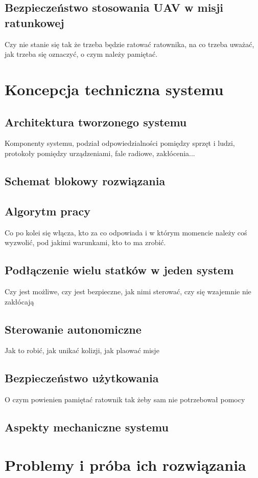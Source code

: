 \subsection{Bezpieczeństwo stosowania UAV w misji ratunkowej}
Czy nie stanie się tak że trzeba będzie ratować ratownika, na co trzeba uważać, jak trzeba się oznaczyć, o czym należy pamiętać.

\section{Koncepcja techniczna systemu}
\subsection{Architektura tworzonego systemu}
Komponenty systemu, podział odpowiedzialności pomiędzy sprzęt i ludzi, protokoły pomiędzy urządzeniami, fale radiowe, zakłócenia...
\subsection{Schemat blokowy rozwiązania}
\subsection{Algorytm pracy}
Co po kolei się włącza, kto za co odpowiada i w którym momencie należy coś wyzwolić, pod jakimi warunkami, kto to ma zrobić.
\subsection{Podłączenie wielu statków w jeden system}
Czy jest możliwe, czy jest bezpieczne, jak nimi sterować, czy się wzajemnie nie zakłócają
\subsection{Sterowanie autonomiczne}
Jak to robić, jak unikać kolizji, jak plaować misje
\subsection{Bezpieczeństwo użytkowania}
O czym powienien pamiętać ratownik tak żeby sam nie potrzebował pomocy
\subsection{Aspekty mechaniczne systemu}

\section{Problemy i próba ich rozwiązania}
